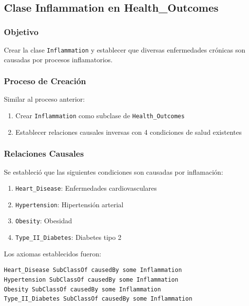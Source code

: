 \documentclass[12pt,a4paper]{article}
\begin{document}
\subsection{Clase Inflammation en Health\_Outcomes}

\subsubsection{Objetivo}

Crear la clase \texttt{Inflammation} y establecer que diversas enfermedades crónicas son causadas por procesos inflamatorios.

\subsubsection{Proceso de Creación}

Similar al proceso anterior:
\begin{enumerate}
    \item Crear \texttt{Inflammation} como subclase de \texttt{Health\_Outcomes}
    \item Establecer relaciones causales inversas con 4 condiciones de salud existentes
\end{enumerate}

\subsubsection{Relaciones Causales}

Se estableció que las siguientes condiciones son causadas por inflamación:

\begin{enumerate}
    \item \texttt{Heart\_Disease}: Enfermedades cardiovasculares
    \item \texttt{Hypertension}: Hipertensión arterial
    \item \texttt{Obesity}: Obesidad
    \item \texttt{Type\_II\_Diabetes}: Diabetes tipo 2
\end{enumerate}

Los axiomas establecidos fueron:

\begin{verbatim}
Heart_Disease SubClassOf causedBy some Inflammation
Hypertension SubClassOf causedBy some Inflammation
Obesity SubClassOf causedBy some Inflammation
Type_II_Diabetes SubClassOf causedBy some Inflammation
\end{verbatim}
\end{document}
